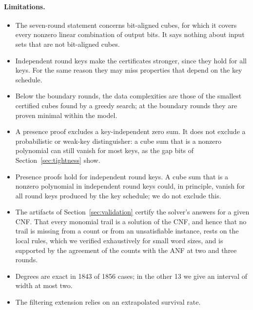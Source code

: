 \documentclass[11pt,a4paper]{article}
\theoremstyle{definition}
\theoremstyle{remark}
\begin{document}
\paragraph{Limitations.}
\begin{itemize}
\item The seven-round statement concerns bit-aligned cubes, for which it covers every nonzero linear combination of output bits. It says nothing about input sets that are not bit-aligned cubes.
\item Independent round keys make the certificates stronger, since they hold for all keys. For the same reason they may miss properties that depend on the key schedule.
\item Below the boundary rounds, the data complexities are those of the smallest certified cubes found by a greedy search; at the boundary rounds they are proven minimal within the model.
\item A presence proof excludes a key-independent zero sum. It does not exclude a probabilistic or weak-key distinguisher: a cube sum that is a nonzero polynomial can still vanish for most keys, as the gap bits of Section~\ref{sec:tightness} show.
\item Presence proofs hold for independent round keys. A cube sum that is a nonzero polynomial in independent round keys could, in principle, vanish for all round keys produced by the key schedule; we do not exclude this.
\item The artifacts of Section~\ref{sec:validation} certify the solver's answers for a given CNF. That every monomial trail is a solution of the CNF, and hence that no trail is missing from a count or from an unsatisfiable instance, rests on the local rules, which we verified exhaustively for small word sizes, and is supported by the agreement of the counts with the ANF at two and three rounds.
\item Degrees are exact in 1843 of 1856 cases; in the other 13 we give an interval of width at most two.
\item The filtering extension relies on an extrapolated survival rate.
\end{itemize}

\end{document}
